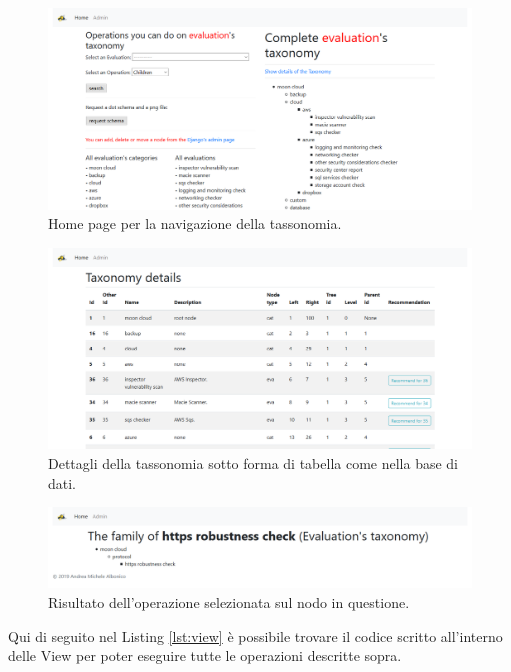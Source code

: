 \begin{figure}
    \includegraphics[scale=0.3]{images/MCRS_taxindex.png}
    \caption{Home page per la navigazione della tassonomia.}
    \label{fig:MCRS_taxindex}
\end{figure}
%
\begin{figure}
    \includegraphics[scale=0.3]{images/MCRS_taxdetails.png}
    \caption{Dettagli della tassonomia sotto forma di tabella come nella base di dati.}
    \label{fig:MCRS_taxdetails}
\end{figure}
%
\begin{figure}
    \includegraphics[scale=0.3]{images/MCRS_taxnodedetails.png}
    \caption{Risultato dell'operazione selezionata sul nodo in questione.}
    \label{fig:MCRS_taxnodedetails}
\end{figure}
%
\newpage
%
\hfill\break
Qui di seguito nel Listing \ref{lst:view} è possibile trovare il codice scritto all'interno delle View per poter eseguire tutte le 
operazioni descritte sopra.
\lstset{style=python_code_style}
\label{lst:view}
